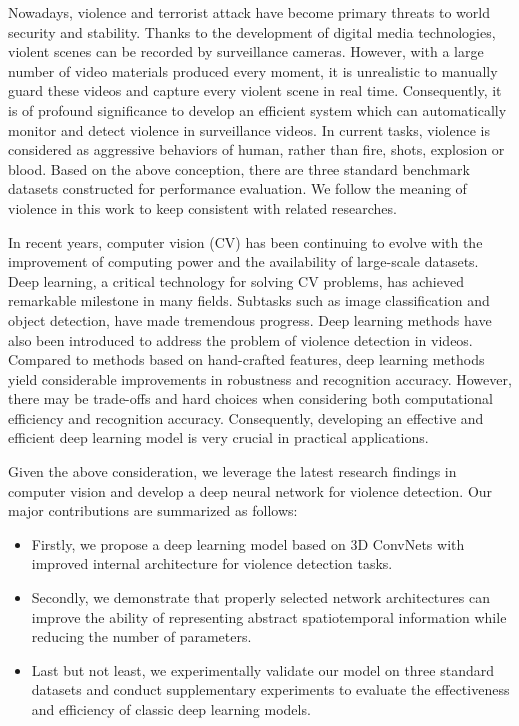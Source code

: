 \documentclass[10pt,twocolumn,letterpaper]{article}
\begin{document}
Nowadays, violence and terrorist attack have become primary threats to world security and stability.
Thanks to the development of digital media technologies, violent scenes can be recorded by surveillance cameras.
However, with a large number of video materials produced every moment, it is unrealistic to manually guard these videos and capture every violent scene in real time.
Consequently, it is of profound significance to develop an efficient system which can automatically monitor and detect violence in surveillance videos.
In current tasks, violence is considered as aggressive behaviors of human, rather than fire, shots, explosion or blood.
Based on the above conception, there are three standard benchmark datasets constructed for performance evaluation.
We follow the meaning of violence in this work to keep consistent with related researches.

In recent years, computer vision (CV) has been continuing to evolve with the improvement of computing power and the availability of large-scale datasets.
Deep learning, a critical technology for solving CV problems, has achieved remarkable milestone in many fields.
Subtasks such as image classification and object detection, have made tremendous progress.
Deep learning methods have also been introduced to address the problem of violence detection in videos.
Compared to methods based on hand-crafted features, deep learning methods yield considerable improvements in robustness and recognition accuracy.
However, there may be trade-offs and hard choices when considering both computational efficiency and recognition accuracy.
Consequently, developing an effective and efficient deep learning model is very crucial in practical applications.

Given the above consideration, we leverage the latest research findings in computer vision and develop a deep neural network for violence detection. Our major contributions are summarized as follows:
\begin{itemize}
	\item Firstly, we propose a deep learning model based on 3D ConvNets with improved internal architecture for violence detection tasks.
	\item Secondly, we demonstrate that properly selected network architectures can improve the ability of  representing abstract spatiotemporal information while reducing the number of parameters.
	\item Last but not least, we experimentally validate our model on three standard datasets and conduct supplementary experiments to evaluate the effectiveness and efficiency of classic deep learning models.
	
\end{itemize}
\end{document}
